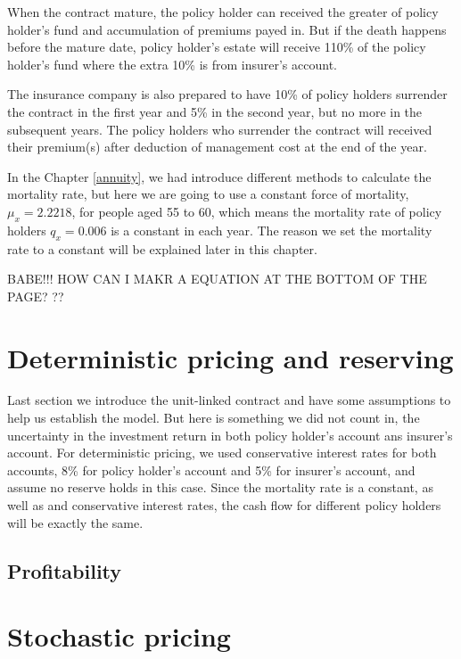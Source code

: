 \documentclass{report}
\begin{document}
When the contract mature, the policy holder can received the greater of policy holder's fund and accumulation of premiums payed in. But if the death happens before the mature date, policy holder's estate will receive 110\% of the policy holder's fund where the extra 10\% is from insurer's account.

The insurance company is also prepared to have 10\% of policy holders surrender the contract in the first year and 5\% in the second year, but no more in the subsequent years. The policy holders who surrender the contract will received their premium(s) after deduction of management cost at the end of the year.

In the Chapter \ref{annuity}, we had introduce different methods to calculate the mortality rate, but here we are going to use a constant force of mortality, $\mu_x=2.2218$, for people aged 55 to 60, which means the mortality rate of policy holders $q_x=0.006$ is a constant in each year. The reason we set the mortality rate to a constant will be explained later in this chapter.  

BABE!!! HOW CAN I MAKR A EQUATION AT THE BOTTOM OF THE PAGE? ??



\section{Deterministic pricing and reserving}

Last section we introduce the unit-linked contract and have some assumptions to help us establish the model. But here is something we did not count in, the uncertainty in the investment return in both policy holder's account ans insurer's account. For deterministic pricing, we used conservative interest rates for both accounts, 8\% for policy holder's account and 5\% for insurer's account, and assume no reserve holds in this case. Since the mortality rate is a constant, as well as and conservative interest rates, the cash flow for different policy holders will be exactly the same. 





\subsection{Profitability}


\section{Stochastic pricing}
\end{document}
